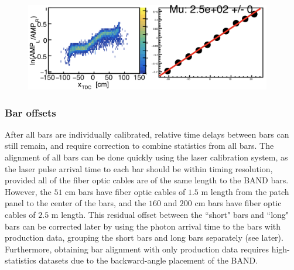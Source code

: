 \documentclass[review]{elsarticle}
\begin{document}
\begin{figure}[h!]
	\centering
		\includegraphics[width=0.96\textwidth]{atten.png}
	\caption{}
	\label{fig:atten}
\end{figure}

\subsubsection{Bar offsets}
After all bars are individually calibrated, relative time delays between bars can still remain, and require correction to combine 
statistics from all bars. The alignment of all bars can be done quickly using the laser calibration system, as the laser pulse arrival 
time to each bar should be within timing resolution, provided all of the fiber optic cables are of the same length to the BAND bars. 
However, the $51$ \si{\centi\meter} bars have fiber optic cables of $1.5$ \si{\meter} length from the patch panel to the center 
of the bars, and the $160$ and $200$  \si{\centi\meter} bars have fiber optic cables of $2.5$ \si{\meter} length. This residual offset 
between the ``short" bars and ``long" bars can be corrected later by using the photon arrival time to the bars with production data, 
grouping the short bars and long bars separately (see later). Furthermore, obtaining bar alignment with only production data 
requires high-statistics datasets due to the backward-angle placement of the BAND. 
\end{document}
